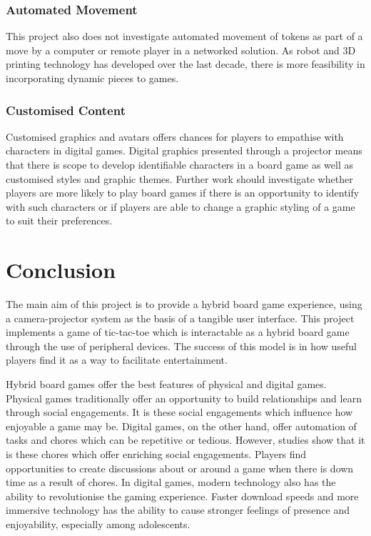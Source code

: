 \documentclass[12pt]{article}
\begin{document}
\subsubsection{Automated Movement}
This project also does not investigate automated movement of tokens as part of a move by a computer or remote player in a networked solution. As robot and 3D printing technology has developed over the last decade, there is more feasibility in incorporating dynamic pieces to games. 

\subsubsection{Customised Content}
Customised graphics and avatars offers chances for players to empathise with characters in digital games.
Digital graphics presented through a projector means that there is scope to develop identifiable characters in a board game as well as customised styles and graphic themes. 
Further work should investigate whether players are more likely to play board games if there is an opportunity to identify with such characters or if players are able to change a graphic styling of a game to suit their preferences. 

\section{Conclusion}
The main aim of this project is to provide a hybrid board game experience, using a camera-projector system as the basis of a tangible user interface. 
This project implements a game of tic-tac-toe which is interactable as a hybrid board game through the use of peripheral devices.
The success of this model is in how useful players find it as a way to facilitate entertainment. 

Hybrid board games offer the best features of physical and digital games.
Physical games traditionally offer an opportunity to build relationships and learn through social engagements. 
It is these social engagements which influence how enjoyable a game may be. 
Digital games, on the other hand, offer automation of tasks and chores which can be repetitive or tedious. 
However, studies show that it is these chores which offer enriching social engagements. 
Players find opportunities to create discussions about or around a game when there is down time as a result of chores.  
In digital games, modern technology also has the ability to revolutionise the gaming experience. 
Faster download speeds and more immersive technology has the ability to cause stronger feelings of presence and enjoyability, especially among adolescents. 
\end{document}
